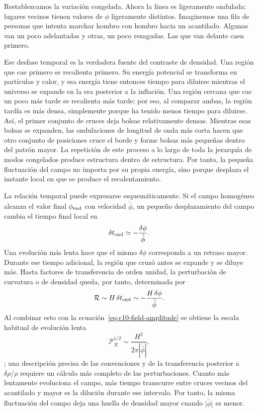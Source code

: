 Restablezcamos la variación congelada. Ahora la línea es ligeramente ondulada: lugares vecinos tienen valores de \(\phi\) ligeramente distintos. Imaginemos una fila de personas que intenta marchar hombro con hombro hacia un acantilado. Algunas van un poco adelantadas y otras, un poco rezagadas. Las que van delante caen primero.

Ese desfase temporal es la verdadera fuente del contraste de densidad. Una región que cae primero se recalienta primero. Su energía potencial se transforma en partículas y calor, y esa energía tiene entonces tiempo para diluirse mientras el universo se expande en la era posterior a la inflación. Una región cercana que cae un poco más tarde se recalienta más tarde; por eso, al comparar ambas, la región tardía es más densa, simplemente porque ha tenido menos tiempo para diluirse. Así, el primer conjunto de cruces deja bolsas relativamente densas. Mientras esas bolsas se expanden, las ondulaciones de longitud de onda más corta hacen que otro conjunto de posiciones cruce el borde y forme bolsas más pequeñas dentro del patrón mayor. La repetición de este proceso a lo largo de toda la jerarquía de modos congelados produce estructura dentro de estructura. Por tanto, la pequeña fluctuación del campo no importa por su propia energía, sino porque desplaza el instante local en que se produce el recalentamiento.

La relación temporal puede expresarse esquemáticamente. Si el campo homogéneo alcanza el valor final \(\phi_{\rm end}\) con velocidad \(\dot{\bar\phi}\), un pequeño desplazamiento del campo cambia el tiempo final local en
\begin{equation}
\delta t_{\rm end}
\simeq-\frac{\delta\phi}{\dot{\bar\phi}}.
\label{eq:c10-time-delay}
\end{equation}
Una evolución más lenta hace que el mismo \(\delta\phi\) corresponda a un retraso mayor. Durante ese tiempo adicional, la región que cruzó antes se expande y se diluye más. Hasta factores de transferencia de orden unidad, la perturbación de curvatura o de densidad queda, por tanto, determinada por
\begin{equation}
\mathcal R
\sim H\,\delta t_{\rm end}
\sim-\frac{H\,\delta\phi}{\dot{\bar\phi}}.
\label{eq:c10-curvature-estimate}
\end{equation}
Al combinar esto con la ecuación~\eqref{eq:c10-field-amplitude} se obtiene la escala habitual de evolución lenta
\begin{equation}
\mathcal P_{\mathcal R}^{1/2}
\sim\frac{H^2}{2\pi|\dot{\bar\phi}|},
\label{eq:c10-slow-roll-amplitude}
\end{equation}
; una descripción precisa de las convenciones y de la transferencia posterior a \(\delta\rho/\rho\) requiere un cálculo más completo de las perturbaciones. Cuanto más lentamente evoluciona el campo, más tiempo transcurre entre cruces vecinos del acantilado y mayor es la dilución durante ese intervalo. Por tanto, la misma fluctuación del campo deja una huella de densidad mayor cuando \(\lvert\dot{\bar\phi}\rvert\) es menor.

